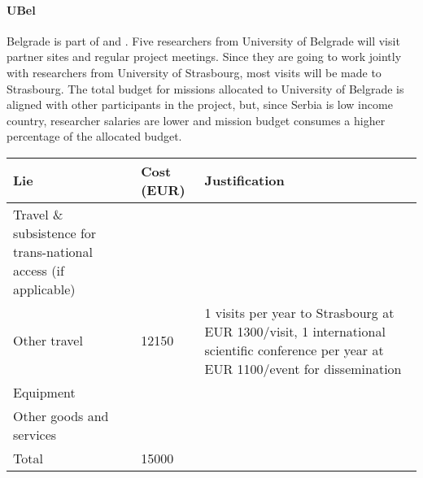 \paragraph*{UBel}

Belgrade is part of  and . 
Five researchers from University of Belgrade will visit partner sites
and regular project meetings. Since they are going to work jointly
with researchers from University of Strasbourg, most visits will be
made to Strasbourg. The total budget for missions allocated to
University of Belgrade is aligned with other participants in the
project, but, since Serbia is low income country, researcher salaries
are lower and mission budget consumes a higher percentage of the
allocated budget.



\noindent
\begin{tabular}{|p{9em}|l|p{}|}
\hline
  Lie & Cost (EUR)  & Justification \\
  \hline
  Travel \& subsistence for trans-national access (if applicable) & & \\
  \hline
  Other travel & 12150 & 1 visits per year to Strasbourg at EUR 1300/visit,
  1 international scientific conference per year at EUR 1100/event for
  dissemination \\
  \hline
  Equipment & & \\
  \hline
  Other goods and services & & \\
  \hline
  \hline
  Total & 15000 & \\
  \hline
\end{tabular}






